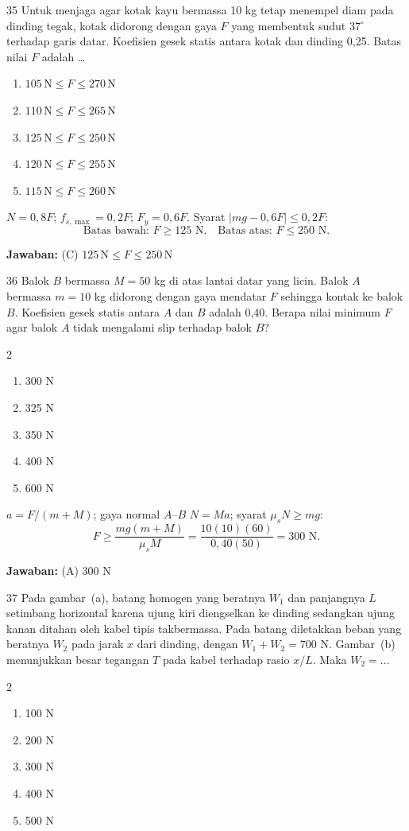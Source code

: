 \documentclass[11pt]{article}
\newenvironment{pil}{%
  \begin{enumerate}[label=(\Alph*),leftmargin=*,itemsep=1pt,topsep=3pt]}%
  {\end{enumerate}}
\newenvironment{pilB}{%
  \par\smallskip\begin{multicols}{2}
  \begin{enumerate}[label=(\Alph*),leftmargin=*,itemsep=1pt,topsep=3pt]}%
  {\end{enumerate}\end{multicols}}
\newcommand{\jawaban}[1]{%
  \noindent\colorbox{gold!30}{\parbox{\dimexpr\linewidth-2\fboxsep\relax}{%
    \textbf{Jawaban:} #1}}\par\smallskip}
\begin{document}
\begin{soal}{35}
Untuk menjaga agar kotak kayu bermassa 10 kg tetap menempel diam pada
dinding tegak, kotak didorong dengan gaya $F$ yang membentuk sudut
$37^\circ$ terhadap garis datar. Koefisien gesek statis antara kotak
dan dinding 0,25. Batas nilai $F$ adalah \ldots
\begin{pil}
  \item $105\,\text{N}\leq F\leq 270\,\text{N}$
  \item $110\,\text{N}\leq F\leq 265\,\text{N}$
  \item $125\,\text{N}\leq F\leq 250\,\text{N}$
  \item $120\,\text{N}\leq F\leq 255\,\text{N}$
  \item $115\,\text{N}\leq F\leq 260\,\text{N}$
\end{pil}
\end{soal}

\begin{pembox}
$N=0{,}8F$; $f_{s,\max}=0{,}2F$; $F_y=0{,}6F$. Syarat $|mg-0{,}6F|\leq0{,}2F$:
\[\text{Batas bawah: }F\geq 125\text{ N.}\quad\text{Batas atas: }F\leq 250\text{ N.}\]
\jawaban{(C) $125\,\text{N}\leq F\leq 250\,\text{N}$}
\end{pembox}

\begin{soal}{36}
Balok $B$ bermassa $M=50$ kg di atas lantai datar yang licin. Balok $A$
bermassa $m=10$ kg didorong dengan gaya mendatar $F$ sehingga kontak ke
balok $B$. Koefisien gesek statis antara $A$ dan $B$ adalah 0,40.
Berapa nilai minimum $F$ agar balok $A$ tidak mengalami slip terhadap
balok $B$?
\begin{pilB}
  \item 300 N \item 325 N \item 350 N \item 400 N \item 600 N
\end{pilB}
\end{soal}

\begin{pembox}
$a=F/(m+M)$; gaya normal $A$--$B$ $N=Ma$; syarat $\mu_s N\geq mg$:
\[F\geq\frac{mg(m+M)}{\mu_s M}=\frac{10(10)(60)}{0{,}40(50)}=300\text{ N.}\]
\jawaban{(A) $300$ N}
\end{pembox}

\begin{soal}{37}
Pada gambar~(a), batang homogen yang beratnya $W_1$ dan panjangnya $L$
setimbang horizontal karena ujung kiri diengselkan ke dinding sedangkan
ujung kanan ditahan oleh kabel tipis takbermassa. Pada batang diletakkan
beban yang beratnya $W_2$ pada jarak $x$ dari dinding, dengan
$W_1+W_2=700$ N. Gambar~(b) menunjukkan besar tegangan $T$ pada kabel
terhadap rasio $x/L$. Maka $W_2=\ldots$
\begin{pilB}
  \item 100 N \item 200 N \item 300 N \item 400 N \item 500 N
\end{pilB}
\end{soal}
\end{document}

